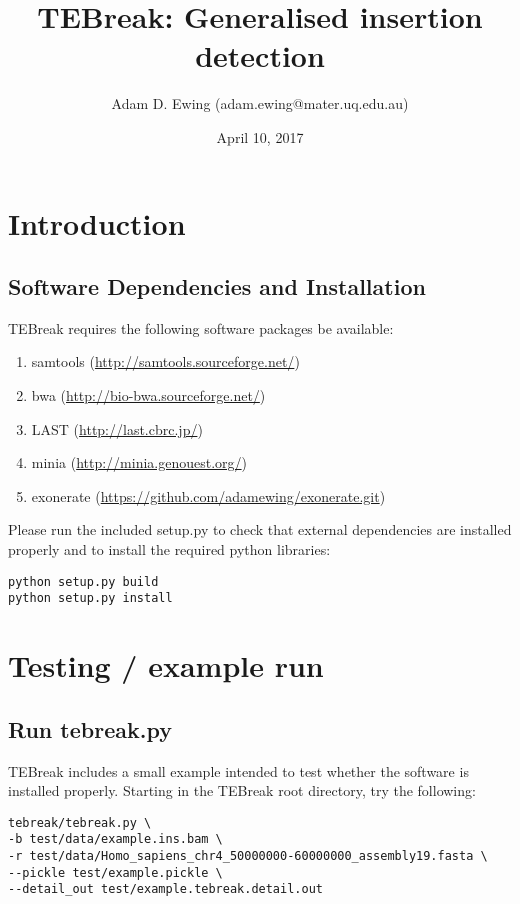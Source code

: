 \documentclass[letterpaper,11pt]{article}
\title{TEBreak: Generalised insertion detection}
\author{Adam D. Ewing (adam.ewing@mater.uq.edu.au)}
\begin{document}
 \date{April 10, 2017}
 \maketitle

\section{Introduction}
\subsection{Software Dependencies and Installation}
TEBreak requires the following software packages be available:

\begin{enumerate}
  \item samtools (\url{http://samtools.sourceforge.net/})
  \item bwa (\url{http://bio-bwa.sourceforge.net/})
  \item LAST (\url{http://last.cbrc.jp/})
  \item minia (\url{http://minia.genouest.org/})
 \item exonerate (\url{https://github.com/adamewing/exonerate.git})
\end{enumerate}

Please run the included setup.py to check that external dependencies are installed properly and to install the required python libraries:

\begin{verbatim}
python setup.py build
python setup.py install
\end{verbatim}

\section{Testing / example run}
\subsection{Run tebreak.py}
TEBreak includes a small example intended to test whether the software is installed properly.
Starting in the TEBreak root directory, try the following:

\begin{verbatim}
tebreak/tebreak.py \
-b test/data/example.ins.bam \
-r test/data/Homo_sapiens_chr4_50000000-60000000_assembly19.fasta \
--pickle test/example.pickle \
--detail_out test/example.tebreak.detail.out
\end{verbatim}
\end{document}
